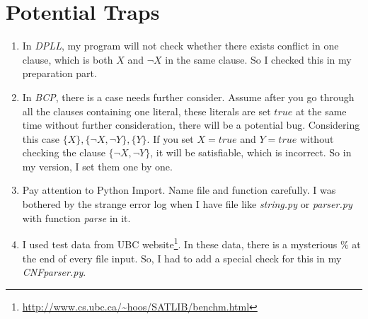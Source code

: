 \documentclass[a4paper,10pt]{article}
\begin{document}
\section{Potential Traps}
\begin{enumerate}
\setlength{\itemsep}{.1em}
\item In \textit{DPLL}, my program will not check whether there exists conflict
    in one clause, which is both $X$ and $\neg X$ in the same clause. So I checked this in my
    preparation part.
\item In \textit{BCP}, there is a case needs further consider. Assume after you go through
    all the clauses containing one literal, these literals are set $true$ at
    the same time without further consideration, there will be a potential bug.
    Considering this case $\{X\},\{\neg X,\neg Y\},\{Y\}$. If you set $X=true$ and $Y=true$
    without checking the clause $\{\neg X,\neg Y\}$, it will be satisfiable, which is
    incorrect. So in my version, I set them one by one.
\item Pay attention to Python Import. Name file and function carefully.
    I was bothered by the strange error log
    when I have file like \textit{string.py} or \textit{parser.py}
    with function \textit{parse} in it.
\item I used test data from UBC 
    website\footnote{\url{http://www.cs.ubc.ca/~hoos/SATLIB/benchm.html}}.
    In these data, there is a mysterious \% at the end of every file input.
    So, I had to add a special check for this in my \textit{CNFparser.py}.
\end{enumerate}
\end{document}
